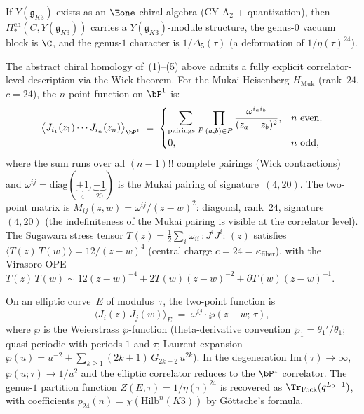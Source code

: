 \begin{conjecture}
\label{conj:yangian-conformal-blocks}
\ClaimStatusConjectured
If $Y(\mathfrak{g}_{K3})$ exists as an $\Eone$-chiral algebra (CY-A$_2$ + quantization), then $H_*^{\mathrm{ch}}(C, Y(\mathfrak{g}_{K3}))$ carries a $Y(\mathfrak{g}_{K3})$-module structure, the genus-$0$ vacuum block is $\C$, and the genus-$1$ character is $1/\Delta_5(\tau)$ (a deformation of $1/\eta(\tau)^{24}$).
\end{conjecture}
\begin{remark}
\label{rem:ran-correlators-explicit}
The abstract chiral homology of~(1)--(5) above admits a fully explicit correlator-level description via the Wick theorem. For the Mukai Heisenberg $H_{\mathrm{Muk}}$ (rank~$24$, $c = 24$), the $n$-point function on $\bP^1$ is:
\begin{equation}\label{eq:ran-n-point-wick}
 \bigl\langle J_{i_1}(z_1) \cdots J_{i_n}(z_n) \bigr\rangle_{\bP^1}
 \;=\;
 \begin{cases}
 \displaystyle\sum_{\text{pairings } P} \prod_{(a,b) \in P} \frac{\omega^{i_a i_b}}{(z_a - z_b)^2}, & n \text{ even}, \\[6pt]
 0, & n \text{ odd},
 \end{cases}
\end{equation}
where the sum runs over all $(n-1)!!$ complete pairings (Wick contractions) and $\omega^{ij} = \mathrm{diag}(\underbrace{+1}_{4}, \underbrace{-1}_{20})$ is the Mukai pairing of signature~$(4, 20)$. The two-point matrix is $M_{ij}(z,w) = \omega^{ij}/(z-w)^2$: diagonal, rank~$24$, signature~$(4,20)$ (the indefiniteness of the Mukai pairing is visible at the correlator level). The Sugawara stress tensor $T(z) = \frac{1}{2}\sum_i \omega_{ii}\, {:}\!J^i J^i\!{:}\,(z)$ satisfies $\langle T(z)\, T(w)\rangle = 12/(z-w)^4$ (central charge $c = 24 = \kappa_{\mathrm{fiber}}$), with the Virasoro OPE $T(z)\,T(w) \sim 12(z-w)^{-4} + 2T(w)(z-w)^{-2} + \partial T(w)(z-w)^{-1}$.

On an elliptic curve~$E$ of modulus~$\tau$, the two-point function is
\begin{equation}\label{eq:elliptic-two-point-ran}
 \bigl\langle J_i(z)\, J_j(w) \bigr\rangle_E
 \;=\;
 \omega^{ij} \cdot \wp(z - w;\, \tau),
\end{equation}
where $\wp$ is the Weierstrass $\wp$-function (theta-derivative convention $\wp_1 = \theta_1'/\theta_1$; quasi-periodic with periods $1$ and $\tau$; Laurent expansion $\wp(u) = u^{-2} + \sum_{k \geq 1} (2k+1)\,G_{2k+2}\,u^{2k}$). In the degeneration $\mathrm{Im}(\tau) \to \infty$, $\wp(u;\tau) \to 1/u^2$ and the elliptic correlator reduces to the $\bP^1$ correlator. The genus-$1$ partition function $Z(E,\tau) = 1/\eta(\tau)^{24}$ is recovered as $\Tr_{\mathrm{Fock}}(q^{L_0 - 1})$, with coefficients $p_{24}(n) = \chi(\mathrm{Hilb}^n(K3))$ by G\"ottsche's formula.


\end{remark}

